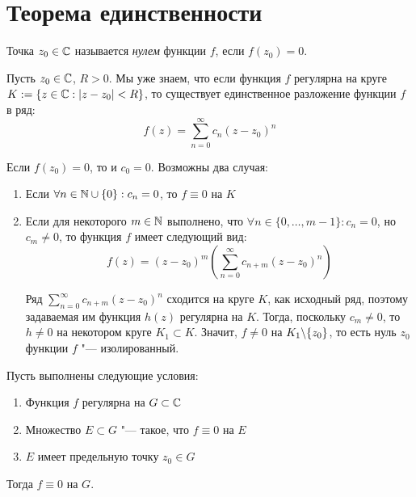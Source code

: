 \section{Теорема единственности}

\begin{definition}
	Точка $z_0 \in \mathbb{C}$ называется \textit{нулем} функции $f$, если $f(z_0) = 0$.
\end{definition}

\begin{note}
	Пусть $z_0 \in \mathbb{C}$, $R > 0$. Мы уже знаем, что если функция $f$ регулярна на круге $K := \{z \in \mathbb{C}: |z - z_0| < R\}$, то существует единственное разложение функции $f$ в ряд:
	\[f(z) = \sum_{n=0}^\infty c_n(z - z_0)^n\]
	
	Если $f(z_0) = 0$, то и $c_0 = 0$. Возможны два случая:
	\begin{enumerate}
		\item Если $\forall n \in \mathbb{N}\cup \{0\}: c_n = 0$, то $f \equiv 0$ на $K$
		\item Если для некоторого $m \in \mathbb{N}$ выполнено, что $\forall n \in \{0, \dotsc, m - 1\}: c_n = 0$, но $c_m \ne 0$, то функция $f$ имеет следующий вид:
		\[f(z) = (z - z_0)^m\left(\sum_{n = 0}^\infty c_{n + m}(z - z_0)^n\right)\]
		
		Ряд $\sum_{n = 0}^\infty c_{n + m}(z - z_0)^n$ сходится на круге $K$, как исходный ряд, поэтому задаваемая им функция $h(z)$ регулярна на $K$. Тогда, поскольку $c_m \ne 0$, то $h \ne 0$ на некотором круге $K_1 \subset K$. Значит, $f \ne 0$ на $K_1 \backslash \{z_0\}$, то есть нуль $z_0$ функции $f$ "--- изолированный.
	\end{enumerate}
\end{note}

\begin{theorem}
	Пусть выполнены следующие условия:
	\begin{enumerate}
		\item Функция $f$ регулярна на $G \subset \mathbb{C}$
		\item Множество $E \subset G$ "--- такое, что $f \equiv 0$ на $E$
		\item $E$ имеет предельную точку $z_0 \in G$
	\end{enumerate}
	
	Тогда $f \equiv 0$ на $G$.
\end{theorem}

